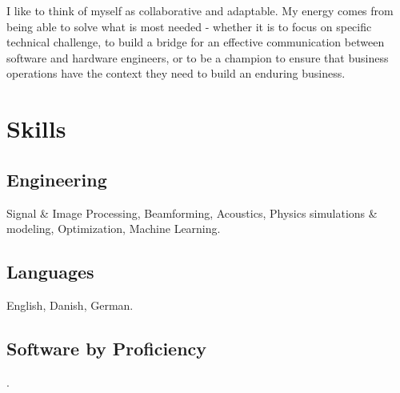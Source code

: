 \documentclass[8pt]{mofiicv}
\begin{document}
\begin{minipage}[T]{\FirstColumnWidth}
I like to think of myself as collaborative and adaptable. My energy comes from being able to solve what is most needed - whether it is to focus on specific technical challenge, to build a bridge for an effective communication between software and hardware engineers, or to be a champion to ensure that business operations have the context they need to build an enduring business. 

\vspace*{2em}
\section{Skills}
\subsection{Engineering} Signal \& Image Processing, Beamforming, Acoustics, Physics simulations \& modeling, Optimization, Machine Learning.
\subsection{Languages} English, Danish, German.

\subsection{Software by Proficiency}
\textcolor{sand2}{.}%
\null\vspace*{1\baselineskip}
\begin{barchart}{4}
\end{barchart}
\end{minipage}
\hspace*{\ColSep}
\end{document}
